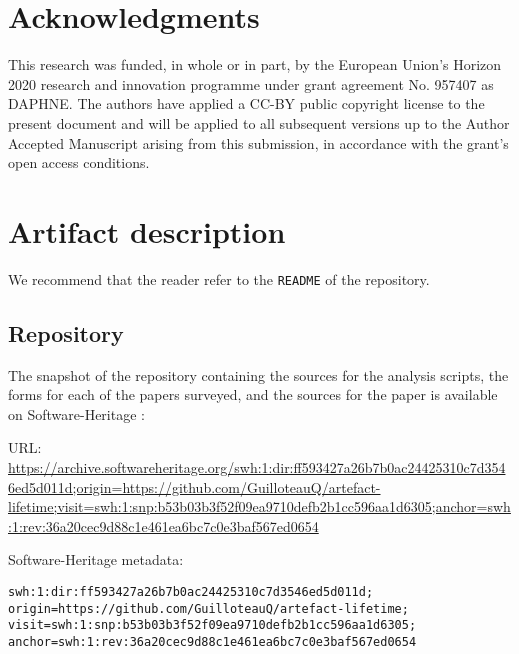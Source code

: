 \documentclass[sigconf,natbib=false]{acmart}
\begin{document}
\section*{Acknowledgments}

This research was funded, in whole or in part, by the European Union’s Horizon 2020 research and innovation programme under grant agreement No. 957407 as DAPHNE.
The authors have applied a CC-BY public copyright license to the present document and will be applied to all subsequent versions up to the Author Accepted Manuscript arising from this submission, in accordance with the grant’s open access conditions.

\newpage


%
%
\printbibliography

\newpage

\appendix

\section{Artifact description}

We recommend that the reader refer to the \texttt{README} of the repository.

\subsection{Repository}

The snapshot of the repository containing the sources for the analysis scripts, the forms for each of the papers surveyed, and the sources for the paper is available on Software-Heritage \cite{artefact-lifetime}:

URL: \url{https://archive.softwareheritage.org/swh:1:dir:ff593427a26b7b0ac24425310c7d3546ed5d011d;origin=https://github.com/GuilloteauQ/artefact-lifetime;visit=swh:1:snp:b53b03b3f52f09ea9710defb2b1cc596aa1d6305;anchor=swh:1:rev:36a20cec9d88c1e461ea6bc7c0e3baf567ed0654}


Software-Heritage metadata:

\begin{verbatim}
swh:1:dir:ff593427a26b7b0ac24425310c7d3546ed5d011d;
origin=https://github.com/GuilloteauQ/artefact-lifetime;
visit=swh:1:snp:b53b03b3f52f09ea9710defb2b1cc596aa1d6305;
anchor=swh:1:rev:36a20cec9d88c1e461ea6bc7c0e3baf567ed0654
\end{verbatim}
\end{document}
